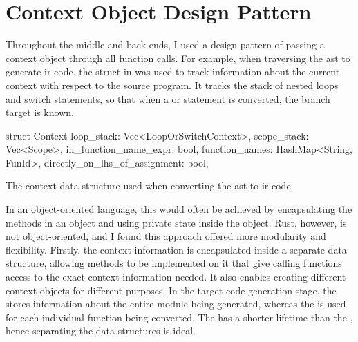 \documentclass[../00-main.tex]{subfiles}
\begin{document}
\section{Context Object Design Pattern}\label{app:sec:context object design pattern}

Throughout the middle and back ends, I used a design pattern of passing a context object through all function calls.
For example, when traversing the \gls{ast} to generate \gls{ir} code, the  struct in  was used to track information about the current context with respect to the source program.
It tracks the stack of nested loops and switch statements, so that when a  or  statement is converted, the branch target is known.

\begin{listing}[t]
  \begin{RustListing}
    struct Context {
        loop_stack: Vec<LoopOrSwitchContext>,
        scope_stack: Vec<Scope>,
        in_function_name_expr: bool,
        function_names: HashMap<String, FunId>,
        directly_on_lhs_of_assignment: bool,
    }
  \end{RustListing}
  \caption{The context data structure used when converting the \gls{ast} to \gls{ir} code.}
  \label{lst:AST to IR context struct}
\end{listing}

In an object-oriented language, this would often be achieved by encapsulating the methods in an object and using private state inside the object.
Rust, however, is not object-oriented, and I found this approach offered more modularity and flexibility.
Firstly, the context information is encapsulated inside a separate data structure, allowing methods to be implemented on it that give calling functions access to the exact context information needed.
It also enables creating different context objects for different purposes.
In the target code generation stage, the  stores information about the entire module being generated, whereas the  is used for each individual function being converted.
The  has a shorter lifetime than the , hence separating the data structures is ideal.
\end{document}
